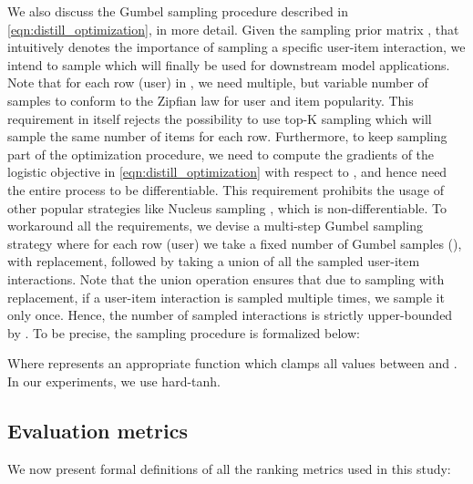 \documentclass{article}
\begin{document}
We also discuss the Gumbel sampling procedure described in \cref{eqn:distill_optimization}, in more detail. Given the sampling prior matrix , that intuitively denotes the importance of sampling a specific user-item interaction, we intend to sample  which will finally be used for downstream model applications. Note that for each row (user) in , we need multiple, but variable number of samples to conform to the Zipfian law for user and item popularity. This requirement in itself rejects the possibility to use top-K sampling which will sample the same number of items for each row. Furthermore, to keep  sampling part of the optimization procedure, we need to compute the gradients of the logistic objective in \cref{eqn:distill_optimization} with respect to , and hence need the entire process to be differentiable. This requirement prohibits the usage of other popular strategies like Nucleus sampling \cite{nucleus}, which is non-differentiable. To workaround all the requirements, we devise a multi-step Gumbel sampling strategy where for each row (user) we take a fixed number of Gumbel samples (), with replacement, followed by taking a union of all the sampled user-item interactions. Note that the union operation ensures that due to sampling with replacement, if a user-item interaction is sampled multiple times, we sample it only once. Hence, the number of sampled interactions is strictly upper-bounded by . To be precise, the sampling procedure is formalized below:



Where  represents an appropriate function which clamps all values between  and . In our experiments, we use hard-tanh.

\subsection{Evaluation metrics} \label{appendix:metrics}

We now present formal definitions of all the ranking metrics used in this study:
\end{document}
